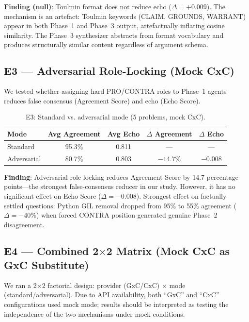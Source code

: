 \documentclass[11pt]{article}
\begin{document}
\noindent\textbf{Finding (null)}: Toulmin format does not reduce echo ($\Delta = +0.009$). The mechanism is an artefact: Toulmin keywords (CLAIM, GROUNDS, WARRANT) appear in both Phase~1 and Phase~3 output, artefactually inflating cosine similarity. The Phase~3 synthesizer abstracts from format vocabulary and produces structurally similar content regardless of argument schema.

\subsection{E3 — Adversarial Role-Locking (Mock CxC)}
\label{sec:e3}

We tested whether assigning hard PRO/CONTRA roles to Phase~1 agents reduces false consensus (Agreement Score) and echo (Echo Score).

\begin{table}[h]
\centering
\caption{E3: Standard vs. adversarial mode (5 problems, mock CxC).}
\label{tab:e3}
\begin{tabular}{lcccc}
\toprule
Mode & Avg Agreement & Avg Echo & $\Delta$ Agreement & $\Delta$ Echo \\
\midrule
Standard & 95.3\% & 0.811 & --- & --- \\
Adversarial & 80.7\% & 0.803 & $\mathbf{-14.7\%}$ & $-0.008$ \\
\bottomrule
\end{tabular}
\end{table}

\noindent\textbf{Finding}: Adversarial role-locking reduces Agreement Score by 14.7 percentage points---the strongest false-consensus reducer in our study. However, it has no significant effect on Echo Score ($\Delta = -0.008$). Strongest effect on factually settled questions: Python GIL removal dropped from 95\% to 55\% agreement ($\Delta = -40\%$) when forced CONTRA position generated genuine Phase~2 disagreement.

\subsection{E4 — Combined 2$\times$2 Matrix (Mock CxC as GxC Substitute)}
\label{sec:e4}

We ran a 2$\times$2 factorial design: provider (GxC/CxC) $\times$ mode (standard/adversarial). Due to API availability, both ``GxC'' and ``CxC'' configurations used mock mode; results should be interpreted as testing the independence of the two mechanisms under mock conditions.
\end{document}
